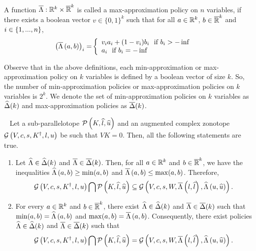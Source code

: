 \begin{definition} A function
  $\overline{\Lambda}:\mathbb{R}^k\times\mathbb{\overline{R}}^k$ is called a
  max-approximation policy on $n$ variables, if there exists a boolean
  vector $v\in\{0,1\}^k$ such that for all $a\in\mathbb{R}^k$,
  $b\in\mathbb{\overline{R}}^k$ and $i\in\{1,...,n\}$,
\begin{align}
\left(\overline{\Lambda}\left(a,b\right)\right)_i= &\left\{
\begin{array}{l}
v_ia_i+(1-v_i)b_i~~\text{if}~b_i>-\inf\\
a_i~~\text{if}~b_i=-\inf
\end{array}
\right.
\end{align}
\end{definition}
%
Observe that in the above definitions, each min-approximation or
max-approximation policy on $k$ variables is defined by a boolean
vector of size $k$.  So, the number of min-approximation policies or
max-approximation policies on $k$ variables is $2^k$.  We denote the
set of min-approximation policies on $k$ variables as
$\widehat{\Delta}(k)$ and max-approximation policies as
$\overline{\Delta}(k)$.


\begin{lemma}~\label{lem:affineapproximation} Let a sub-parallelotope
  $\mathcal{P}\left(K,\widehat{l},\widehat{u}\right)$ and an augmented complex zonotope
  $\mathcal{G}\left(V,c,s,K^\dagger,l,u\right)$ be such that $VK=0$.  Then,
  all
  the following statements are true.
\begin{enumerate}
\item Let $\widehat{\Lambda}\in\widehat{\Delta}(k)$ and
  $\overline{\Lambda}\in\overline{\Delta}(k)$.  %
  Then, for all $a
  \in\mathbb{R}^k$ and $b\in\mathbb{\overline{R}}^k$, we have the inequalities $\widehat{\Lambda}\left(a,b\right)\geq \min(a,b)$ and
  $\overline{\Lambda}\left(a,b\right)\leq \max(a,b)$.
  Therefore, \[\mathcal{G}\left(V,c,s,K^\dagger,l,u\right)\bigcap \mathcal{P}\left(K,\widehat{l},\widehat{u}\right) \subseteq
  \mathcal{G}\left(V,c,s,W,\overline{\Lambda}\left(l,\widehat{l}\right),\widehat{\Lambda}\left(u,\widehat{u}\right)\right).\]
\item For every $a\in\mathbb{R}^k$ and $b\in\mathbb{\overline{R}}^k$, there exist
  $\widehat{\Lambda}\in\widehat{\Delta}(k)$ and
  $\overline{\Lambda}\in\overline{\Delta}(k)$ such that
  $\min(a,b)=\widehat{\Lambda}\left(a,b\right)$ and
  $\max(a,b)=\overline{\Lambda}\left(a,b\right)$. Consequently, there exist policies
  $\widehat{\Lambda}\in\widehat{\Delta}(k)$ and
  $\overline{\Lambda}\in\overline{\Delta}(k)$ such that
\[\mathcal{G}\left(V,c,s,K^\dagger,l,u\right)\bigcap \mathcal{P}\left(K,\widehat{l},\widehat{u}\right) =
  \mathcal{G}\left(V,c,s,W,\overline{\Lambda}\left(l,\widehat{l}\right),\widehat{\Lambda}\left(u,\widehat{u}\right)\right).\]
\end{enumerate}
\end{lemma}





